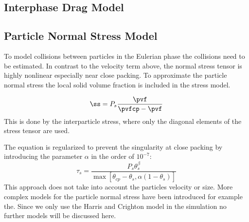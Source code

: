 \color{gray}
\subsection{Interphase Drag Model}

\subsection{Particle Normal Stress Model}
To model collisions between particles in the Eulerian phase the collisions need to be estimated. 
In contrast to the velocity term above, the normal stress tensor is highly nonlinear especially near close packing.
To approximate the particle normal stress the local solid volume fraction is included in the stress model. 

\begin{equation}
    \label{eq:solidStress}
    \ss = P_s \dfrac{\pvf}{\pvfcp - \pvf}
\end{equation}
This is done by the interparticle stress, where only the diagonal elements of the stress tensor are used.

The equation is regularized to prevent the singularity at close packing by introducing the parameter $\alpha$ in the order of $10^{-7}$:
\begin{equation}
    \tau_s = \dfrac{P_s \theta_s^\beta}{\max [\theta_{cp} - \theta_s, \alpha (1 - \theta_s)]}
\end{equation}
This approach does not take into account the particles velocity or size.
More complex models for the particle normal stress have been introduced for example the.
Since we only use the Harris and Crighton model in the simulation no further models will be discussed here.




\color{gray}
